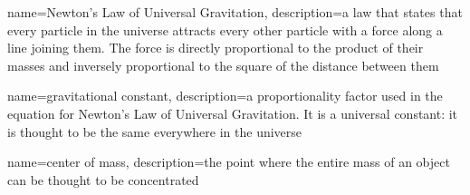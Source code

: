 
{
    name=Newton's Law of Universal Gravitation,
    description={a law that states that every particle in the universe attracts every other particle with a force along a line joining them. The force is directly proportional to the product of their masses and inversely proportional to the square of the distance between them}
}

{
    name=gravitational constant,
    description={a proportionality factor used in the equation for Newton’s Law of Universal Gravitation. It is a universal constant: it is thought to be the same everywhere in the universe}
}

{
    name=center of mass,
    description={the point where the entire mass of an object can be thought to be concentrated}
}



